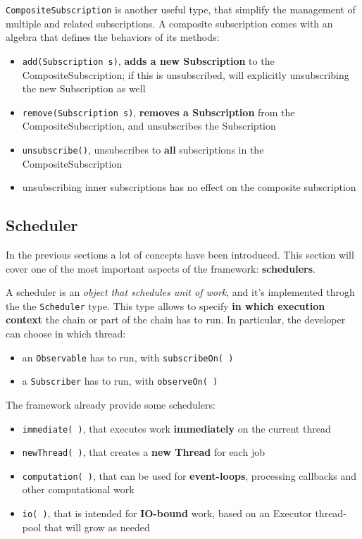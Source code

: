 \texttt{CompositeSubscription} is another useful type, that simplify the
management of multiple and related subscriptions. A composite
subscription comes with an algebra that defines the behaviors of its
methods:

\begin{itemize}
\itemsep1pt\parskip0pt
\item
  \texttt{add(Subscription\ s)}, \textbf{adds a new Subscription} to the
  CompositeSubscription; if this is unsubscribed, will explicitly
  unsubscribing the new Subscription as well
\item
  \texttt{remove(Subscription\ s)}, \textbf{removes a Subscription} from
  the CompositeSubscription, and unsubscribes the Subscription
\item
  \texttt{unsubscribe()}, unsubscribes to \textbf{all} subscriptions in
  the CompositeSubscription
\item
  unsubscribing inner subscriptions has no effect on the composite
  subscription
\end{itemize}


\subsection{Scheduler}\label{scheduler}

In the previous sections a lot of concepts have been introduced. This
section will cover one of the most important aspects of the framework:
\textbf{schedulers}.

A scheduler is an \emph{object that schedules unit of work}, and it's
implemented throgh the the \texttt{Scheduler} type. This type allows to
specify \textbf{in which execution context} the chain or part of the
chain has to run. In particular, the developer can choose in which
thread:

\begin{itemize}
\itemsep1pt\parskip0pt
\item
  an \texttt{Observable} has to run, with \texttt{subscribeOn(\ )}
\item
  a \texttt{Subscriber} has to run, with \texttt{observeOn(\ )}
\end{itemize}

The framework already provide some schedulers: 

\begin{itemize}
\itemsep1pt\parskip0pt
\item
  \texttt{immediate(\ )},
that executes work \textbf{immediately} on the current thread
\item
  \texttt{newThread(\ )}, that creates a \textbf{new Thread} for each job
\item
  \texttt{computation(\ )}, that can be used for \textbf{event-loops},
processing callbacks and other computational work 
\item
  \texttt{io(\ )},
that is intended for \textbf{IO-bound} work, based on an Executor
thread-pool that will grow as needed
\end{itemize}

